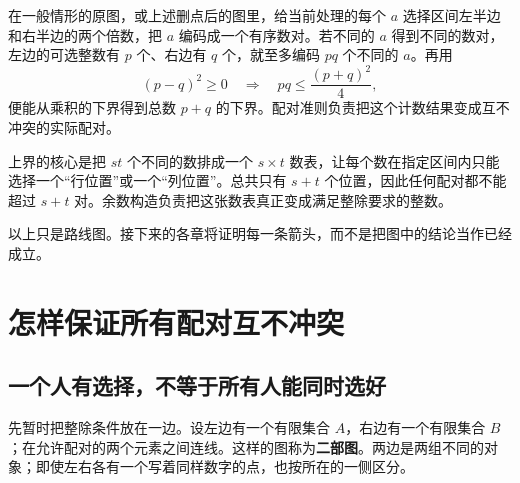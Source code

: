 \documentclass[UTF8,a4paper,oneside,openany,fontset=fandol,zihao=-4]{ctexbook}
\theoremstyle{guide}
\newcommand{\ceil}[1]{\left\lceil#1\right\rceil}
\begin{document}
在一般情形的原图，或上述删点后的图里，给当前处理的每个 $a$ 选择区间左半边和右半边的两个倍数，把 $a$ 编码成一个有序数对。若不同的 $a$ 得到不同的数对，左边的可选整数有 $p$ 个、右边有 $q$ 个，就至多编码 $pq$ 个不同的 $a$。再用
\[
(p-q)^2\ge0
\quad\Longrightarrow\quad
pq\le\frac{(p+q)^2}{4},
\]
便能从乘积的下界得到总数 $p+q$ 的下界。配对准则负责把这个计数结果变成互不冲突的实际配对。

上界的核心是把 $st$ 个不同的数排成一个 $s\times t$ 数表，让每个数在指定区间内只能选择一个“行位置”或一个“列位置”。总共只有 $s+t$ 个位置，因此任何配对都不能超过 $s+t$ 对。余数构造负责把这张数表真正变成满足整除要求的整数。

\begin{center}
\end{center}
以上只是路线图。接下来的各章将证明每一条箭头，而不是把图中的结论当作已经成立。

\chapter{怎样保证所有配对互不冲突}
\label{mat:chapter}

\section{一个人有选择，不等于所有人能同时选好}

先暂时把整除条件放在一边。设左边有一个有限集合 $A$，右边有一个有限集合 $B$；在允许配对的两个元素之间连线。这样的图称为\textbf{二部图}。两边是两组不同的对象；即使左右各有一个写着同样数字的点，也按所在的一侧区分。
\end{document}
